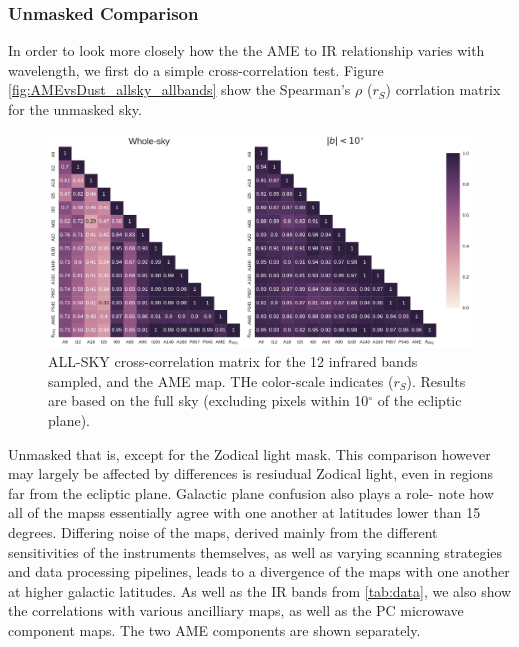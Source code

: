     \subsubsection{Unmasked Comparison}
        In order to look more closely how the the AME to IR relationship varies with wavelength, we first do a simple cross-correlation test. Figure \ref{fig:AMEvsDust_allsky_allbands} show the Spearman's $\rho$ ($r_{S}$) corrlation matrix for the unmasked sky.
        \begin{figure}
          \includegraphics[width=\textwidth]{../Plots/all_bands_corr_matrix_wAME_spearman.pdf}
          \centering
          \caption{ALL-SKY cross-correlation matrix for the 12 infrared bands sampled, and the AME map. THe color-scale indicates ($r_{S}$). Results are based on the full sky (excluding pixels within 10$^{\circ}$ of the ecliptic plane).}
          \label{fig:AME_IR_crosscorr_allbandsg}
        \end{figure}
        Unmasked that is, except for the Zodical light mask. This comparison however may largely be affected by differences is resiudual Zodical light, even in regions far from the ecliptic plane. Galactic plane confusion also plays a role- note how all of the mapss essentially agree with one another at latitudes lower than 15 degrees. Differing noise of the maps, derived mainly from the different sensitivities of the instruments themselves, as well as varying scanning strategies and data processing pipelines, leads to a divergence of the maps with one another at higher galactic latitudes. As well as the IR bands from \ref{tab:data}, we also show the correlations with various ancilliary maps, as well as the PC microwave component maps. The two AME components are shown separately.

